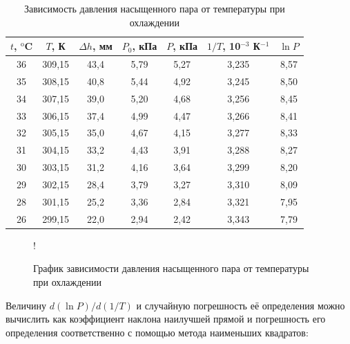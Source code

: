 \documentclass[a4paper,12pt]{article} %
\begin{document}
\begin{table}[]
    \centering
    \begin{tabular}{|c|c|c|c|c|c|c|}\hline
        $t$, $^\text{o}$C & $T$, К & $\Delta h$, мм & $P_0$, кПа & $P$, кПа & $1/T$, 10$^{-3}$ К$^{-1}$ & $\ln P$ \\ \hline
        36 & 309,15 & 43,4 & 5,79 & 5,27 & 3,235 & 8,57 \\ \hline
        35 & 308,15 & 40,8 & 5,44 & 4,92 & 3,245 & 8,50 \\ \hline
        34 & 307,15 & 39,0 & 5,20 & 4,68 & 3,256 & 8,45 \\ \hline
        33 & 306,15 & 37,4 & 4,99 & 4,47 & 3,266 & 8,41 \\ \hline
        32 & 305,15 & 35,0 & 4,67 & 4,15 & 3,277 & 8,33 \\ \hline
        31 & 304,15 & 33,2 & 4,43 & 3,91 & 3,288 & 8,27 \\ \hline
        30 & 303,15 & 31,2 & 4,16 & 3,64 & 3,299 & 8,20 \\ \hline
        29 & 302,15 & 28,4 & 3,79 & 3,27 & 3,310 & 8,09 \\ \hline
        28 & 301,15 & 25,2 & 3,36 & 2,84 & 3,321 & 7,95 \\ \hline
        26 & 299,15 & 22,0 & 2,94 & 2,42 & 3,343 & 7,79 \\ \hline
    \end{tabular}
    \caption{Зависимость давления насыщенного пара от температуры при охлаждении}
    \label{tab:cooling}
\end{table}

\begin{figure}
\centering
{} {!} {
}
\caption{График зависимости давления насыщенного пара от температуры при охлаждении}
\label{graph:cooling}
\end{figure}

Величину $d(\ln P)/d(1/T)$ и случайную погрешность её определения можно вычислить как коэффициент наклона наилучшей прямой и погрешность его определения соответственно с помощью метода наименьших квадратов:
\end{document}
